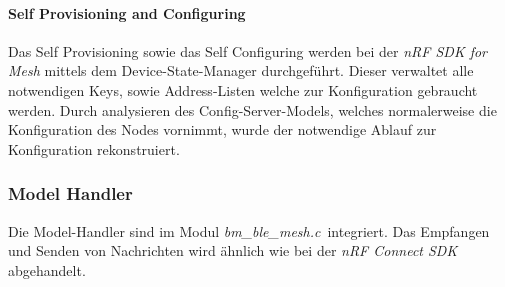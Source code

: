 

\paragraph{Self Provisioning and Configuring}

Das Self Provisioning sowie das Self Configuring werden bei der \textit{nRF SDK for Mesh} mittels dem Device-State-Manager durchgeführt. Dieser verwaltet alle notwendigen Keys, sowie Address-Listen welche zur Konfiguration gebraucht werden. Durch analysieren des Config-Server-Models, welches normalerweise die Konfiguration des Nodes vornimmt, wurde der notwendige Ablauf zur Konfiguration rekonstruiert. 

\subsubsection{Model Handler}\label{subsubsec:BluetoothMeshUmsetzungnRFSDKModelHandler}

Die Model-Handler sind im Modul \textit{bm\_ble\_mesh.c}\footnotemark\ integriert. Das Empfangen und Senden von Nachrichten wird ähnlich wie bei der \textit{nRF Connect SDK} abgehandelt. 
